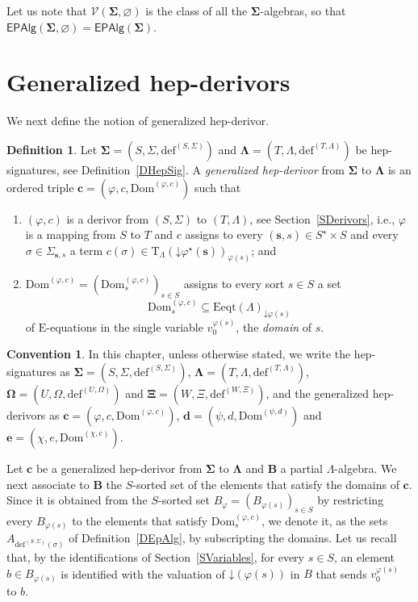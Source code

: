 \documentclass[a4paper, reqno]{amsbook}
\newcommand{\vs}[1]{\mathbin{\downarrow}#1}
\newcommand{\sig}[1]{\mathbf{#1}}             %
\newcommand{\Dom}{\mathrm{Dom}}
\theoremstyle{plain}
\theoremstyle{definition}
\newtheorem{definition}[theorem]{Definition}
\newtheorem*{convention}{Convention}
\begin{document}
Let us note that $\mathcal{V}(\sig{\Sigma},\varnothing)$ is the class of all the $\sig{\Sigma}$-algebras, so that $\mathsf{EPAlg}(\sig{\Sigma},\varnothing)=\mathsf{EPAlg}(\sig{\Sigma})$.

\section{Generalized hep-derivors}\label{SGenHepDerivorsDef}

We next define the notion of generalized hep-derivor.

\begin{definition}\label{DGenHepDerivor}
Let $\sig{\Sigma}=(S,\Sigma,\mathrm{def}^{(S,\Sigma)})$ and $\sig{\Lambda}=(T,\Lambda,\mathrm{def}^{(T,\Lambda)})$ be hep-signatures, see Definition~\ref{DHepSig}.
A \emph{generalized hep-derivor} from $\sig{\Sigma}$ to $\sig{\Lambda}$ is an ordered triple $\mathbf{c}=(\varphi,c,\Dom^{(\varphi,c)})$ such that
\begin{enumerate}
\item $(\varphi,c)$ is a derivor from $(S,\Sigma)$ to $(T,\Lambda)$, see Section~\ref{SDerivors}, i.e., $\varphi$ is a mapping from $S$ to $T$ and $c$ assigns to every $(\mathbf{s},s)\in S^{\star}\times S$ and every $\sigma\in\Sigma_{\mathbf{s},s}$ a term $c(\sigma)\in\mathrm{T}_{\Lambda}(\vs{\varphi^{\star}(\mathbf{s})})_{\varphi(s)}$; and
\item $\Dom^{(\varphi,c)}=(\Dom^{(\varphi,c)}_{s})_{s\in S}$ assigns to every sort $s\in S$ a set
$$
\Dom^{(\varphi,c)}_{s}\subseteq\mathrm{Eeqt}(\Lambda)_{\vs{\varphi(s)}}
$$
of $\mathrm{E}$-equations in the single variable $v^{\varphi(s)}_{0}$, the \emph{domain} of $s$.
\end{enumerate}
\end{definition}

\begin{convention}
In this chapter, unless otherwise stated, we write the hep-signatures as $\sig{\Sigma}=(S,\Sigma,\mathrm{def}^{(S,\Sigma)})$, $\sig{\Lambda}=(T,\Lambda,\mathrm{def}^{(T,\Lambda)})$, $\sig{\Omega}=(U,\Omega,\mathrm{def}^{(U,\Omega)})$ and $\sig{\Xi}=(W,\Xi,\mathrm{def}^{(W,\Xi)})$, and the generalized hep-derivors as $\mathbf{c}=(\varphi,c,\Dom^{(\varphi,c)})$, $\mathbf{d}=(\psi,d,\Dom^{(\psi,d)})$ and $\mathbf{e}=(\chi,e,\Dom^{(\chi,e)})$.
\end{convention}

Let $\mathbf{c}$ be a generalized hep-derivor from $\sig{\Sigma}$ to $\sig{\Lambda}$ and $\mathbf{B}$ a partial $\Lambda$-algebra.
We next associate to $\mathbf{B}$ the $S$-sorted set of the elements that satisfy the domains of $\mathbf{c}$.
Since it is obtained from the $S$-sorted set $B_{\varphi}=(B_{\varphi(s)})_{s\in S}$ by restricting every $B_{\varphi(s)}$ to the elements that satisfy $\Dom^{(\varphi,c)}_{s}$, we denote it, as the sets $A_{\mathrm{def}^{(S,\Sigma)}(\sigma)}$ of Definition~\ref{DEpAlg}, by subscripting the domains.
Let us recall that, by the identifications of Section~\ref{SVariables}, for every $s\in S$, an element $b\in B_{\varphi(s)}$ is identified with the valuation of $\vs{(\varphi(s))}$ in $B$ that sends $v^{\varphi(s)}_{0}$ to $b$.
\end{document}
